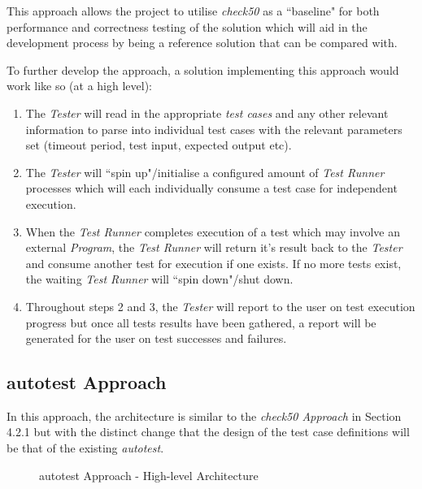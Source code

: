 \documentclass[hidelinks]{report}
\begin{document}
This approach allows the project to utilise \textit{check50} as a ``baseline" for both performance and correctness testing of the solution which will aid in the development process by being a reference solution that can be compared with.

To further develop the approach, a solution implementing this approach would work like so (at a high level):
\begin{enumerate}
	\item The \textit{Tester} will read in the appropriate \textit{test cases} and any other relevant information to parse into individual test cases with the relevant parameters set (timeout period, test input, expected output etc).
	\item The \textit{Tester} will ``spin up"/initialise a configured amount of \textit{Test Runner} processes which will each individually consume a test case for independent execution.
	\item When the \textit{Test Runner} completes execution of a test which may involve an external \textit{Program}, the \textit{Test Runner} will return it's result back to the \textit{Tester} and consume another test for execution if one exists. If no more tests exist, the waiting \textit{Test Runner} will ``spin down"/shut down.
	\item Throughout steps 2 and 3, the \textit{Tester} will report to the user on test execution progress but once all tests results have been gathered, a report will be generated for the user on test successes and failures.
\end{enumerate}

\subsection{autotest Approach}

In this approach, the architecture is similar to the \textit{check50 Approach} in Section 4.2.1 but with the distinct change that the design of the test case definitions will be that of the existing \textit{autotest}.

\begin{figure}[h]
	\centering
	\caption{autotest Approach - High-level Architecture}
	\label{fig:approach2-1}
\end{figure}
\end{document}
